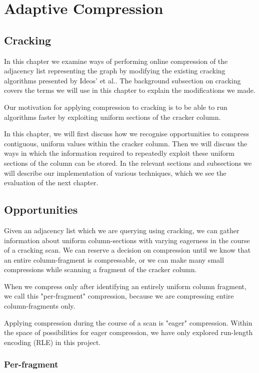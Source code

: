 \chapter{Adaptive Compression}
\label{ch:adaptivecompression}

\section{Cracking}

In this chapter we examine ways of performing online compression of the adjacency list representing
the graph by modifying the existing cracking algorithms presented by Ideos' et al.. The background
subsection on cracking covers the terms we will use in this chapter to explain the modifications we
made.

Our motivation for applying compression to cracking is to be able to run algorithms faster by exploiting uniform sections of the cracker column.

In this chapter, we will first discuss how we recognise opportunities to compress contiguous, uniform values within the cracker column. Then we will discuss the ways in which the information required to repeatedly exploit these uniform sections of the column can be stored. In the relevant sections and subsections we will describe our implementation of various techniques, which we see the evaluation of the next chapter.

\section{Opportunities}

Given an adjacency list which we are querying using cracking, we can gather information about uniform column-sections with varying eagerness in the course of a cracking scan. We can reserve a decision on compression until we know that an entire column-fragment is compressable, or we can make many small compressions while scanning a fragment of the cracker column.

When we compress only after identifying an entirely uniform column fragment, we call this "per-fragment" compression, because we are compressing entire column-fragments only.

Applying compression during the course of a scan is "eager" compression. Within the space of possibilities for eager compression, we have only explored run-length encoding (RLE) in this project.

\subsection{Per-fragment}

